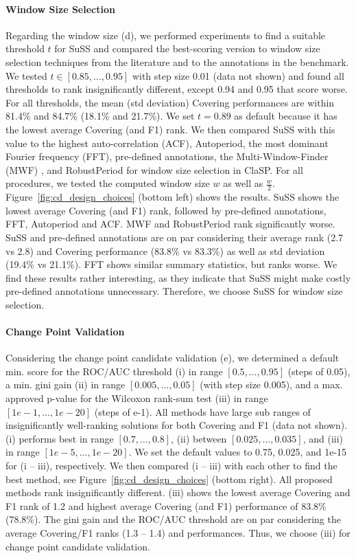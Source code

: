 \documentclass[pdflatex,sn-basic]{sn-jnl}
\begin{document}
\paragraph{Window Size Selection}
Regarding the window size (d), we performed experiments to find a suitable threshold $t$ for SuSS and compared the best-scoring version to window size selection techniques from the literature and to the annotations in the benchmark. We tested $t \in [0.85,\dots,0.95]$ with step size 0.01 (data not shown) and found all thresholds to rank insignificantly different, except 0.94 and 0.95 that score worse. For all thresholds, the mean (std deviation) Covering performances are within 81.4\% and 84.7\% (18.1\% and 21.7\%). We set $t=0.89$ as default because it has the lowest average Covering (and F1) rank. We then compared SuSS with this value to the highest auto-correlation (ACF), Autoperiod, the most dominant Fourier frequency (FFT), pre-defined annotations, the Multi-Window-Finder (MWF) \citep{ImaniMultiWindowFinderDA}, and RobustPeriod for window size selection in ClaSP. For all procedures, we tested the computed window size $w$ as well as $\frac{w}{2}$. Figure~\ref{fig:cd_design_choices} (bottom left) shows the results. SuSS shows the lowest average Covering (and F1) rank, followed by pre-defined annotations, FFT, Autoperiod and ACF. MWF and RobustPeriod rank significantly worse. SuSS and pre-defined annotations are on par considering their average rank (2.7 vs 2.8) and Covering performance (83.8\% vs 83.3\%) as well as std deviation (19.4\% vs 21.1\%). FFT shows similar summary statistics, but ranks worse. We find these results rather interesting, as they indicate that SuSS might make costly pre-defined annotations unnecessary. Therefore, we choose SuSS for window size selection.

\paragraph{Change Point Validation}
Considering the change point candidate validation (e), we determined a default min. score for the ROC/AUC threshold (i) in range $[0.5,\dots,0.95]$ (steps of 0.05), a min. gini gain (ii) in range $[0.005,\dots,0.05]$ (with step size 0.005), and a max. approved p-value for the Wilcoxon rank-sum test (iii) in range $[1e-1,\dots,1e-20]$ (steps of e-1). All methods have large sub ranges of insignificantly well-ranking solutions for both Covering and F1 (data not shown). (i) performs best in range $[0.7,\dots,0.8]$, (ii) between $[0.025,\dots,0.035]$, and (iii) in range $[1e-5,\dots,1e-20]$. We set the default values to 0.75, 0.025, and 1e-15 for (i -- iii), respectively. We then compared (i -- iii) with each other to find the best method, see Figure~\ref{fig:cd_design_choices} (bottom right). All proposed methods rank insignificantly different. (iii) shows the lowest average Covering and F1 rank of 1.2 and highest average Covering (and F1) performance of 83.8\% (78.8\%). The gini gain and the ROC/AUC threshold are on par considering the average Covering/F1 ranks (1.3 -- 1.4) and performances. Thus, we choose (iii) for change point candidate validation. 
\end{document}
